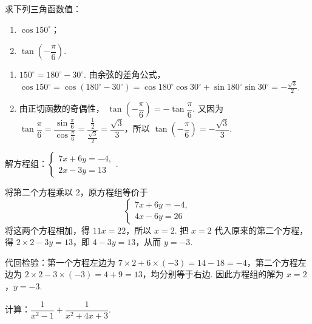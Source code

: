 \begin{problem}
求下列三角函数值：
\begin{enumerate}
\item \(\cos150^\circ\)；
\item \(\tan\left(-\dfrac{\pi}{6}\right)\).
\end{enumerate}
\end{problem}

\begin{solution}
\begin{enumerate}
\item \(150^\circ=180^\circ-30^\circ\). 由余弦的差角公式，
\(\cos150^\circ=\cos\left(180^\circ-30^\circ\right)=\cos180^\circ\cos30^\circ+\sin180^\circ\sin30^\circ=-\frac{\sqrt{3}}{2}\).

\item 由正切函数的奇偶性，
\(\tan\left(-\dfrac{\pi}{6}\right)=-\tan\dfrac{\pi}{6}\). 又因为
\(\tan\dfrac{\pi}{6}=\dfrac{\sin\frac{\pi}{6}}{\cos\frac{\pi}{6}}=\dfrac{\frac{1}{2}}{\frac{\sqrt{3}}{2}}=\dfrac{\sqrt{3}}{3}\)，所以
\(\tan\left(-\dfrac{\pi}{6}\right)=-\dfrac{\sqrt{3}}{3}\).
\end{enumerate}
\end{solution}

\begin{problem}
解方程组：\(
\begin{cases}
7x+6y=-4,\\
2x-3y=13
\end{cases}
\).
\end{problem}

\begin{solution}
将第二个方程乘以 \(2\)，原方程组等价于
\[
\begin{cases}
7x+6y=-4,\\
4x-6y=26
\end{cases}
\]
将这两个方程相加，得 \(11x=22\)，所以 \(x=2\). 把 \(x=2\) 代入原来的第二个方程，得
\(2\times2-3y=13\)，即 \(4-3y=13\)，从而 \(y=-3\).

代回检验：第一个方程左边为 \(7\times2+6\times(-3)=14-18=-4\)，第二个方程左边为 \(2\times2-3\times(-3)=4+9=13\)，均分别等于右边. 因此方程组的解为 \(x=2\)，\(y=-3\).
\end{solution}

\begin{problem}
计算：\( \dfrac{1}{x^2-1}+\dfrac{1}{x^2+4x+3} \).
\end{problem}


